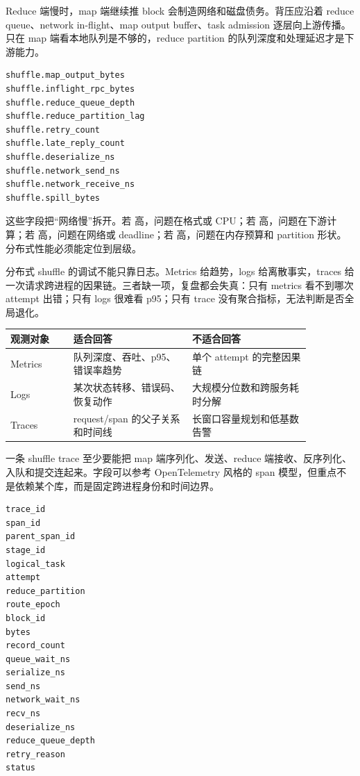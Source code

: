 Reduce 端慢时，map 端继续推 block 会制造网络和磁盘债务。背压应沿着 reduce queue、network in-flight、map output buffer、task admission 逐层向上游传播。只在 map 端看本地队列是不够的，reduce partition 的队列深度和处理延迟才是下游能力。

\begin{lstlisting}[numbers=none,caption={shuffle 背压字段}]
shuffle.map_output_bytes
shuffle.inflight_rpc_bytes
shuffle.reduce_queue_depth
shuffle.reduce_partition_lag
shuffle.retry_count
shuffle.late_reply_count
shuffle.deserialize_ns
shuffle.network_send_ns
shuffle.network_receive_ns
shuffle.spill_bytes
\end{lstlisting}

这些字段把“网络慢”拆开。若  高，问题在格式或 CPU；若  高，问题在下游计算；若  高，问题在网络或 deadline；若  高，问题在内存预算和 partition 形状。分布式性能必须能定位到层级。

分布式 shuffle 的调试不能只靠日志。Metrics 给趋势，logs 给离散事实，traces 给一次请求跨进程的因果链。三者缺一项，复盘都会失真：只有 metrics 看不到哪次 attempt 出错；只有 logs 很难看 p95；只有 trace 没有聚合指标，无法判断是否全局退化。

\begin{center}
\small
\begin{tabular}{p{0.18\linewidth}p{0.34\linewidth}p{0.34\linewidth}}
\toprule
观测对象 & 适合回答 & 不适合回答 \\
\midrule
Metrics & 队列深度、吞吐、p95、错误率趋势 & 单个 attempt 的完整因果链 \\
Logs & 某次状态转移、错误码、恢复动作 & 大规模分位数和跨服务耗时分解 \\
Traces & request/span 的父子关系和时间线 & 长窗口容量规划和低基数告警 \\
\bottomrule
\end{tabular}
\end{center}

一条 shuffle trace 至少要能把 map 端序列化、发送、reduce 端接收、反序列化、入队和提交连起来。字段可以参考 OpenTelemetry 风格的 span 模型，但重点不是依赖某个库，而是固定跨进程身份和时间边界。

\begin{lstlisting}[numbers=none,caption={ShuffleSpan 最小字段}]
trace_id
span_id
parent_span_id
stage_id
logical_task
attempt
reduce_partition
route_epoch
block_id
bytes
record_count
queue_wait_ns
serialize_ns
send_ns
network_wait_ns
recv_ns
deserialize_ns
reduce_queue_depth
retry_reason
status
\end{lstlisting}

